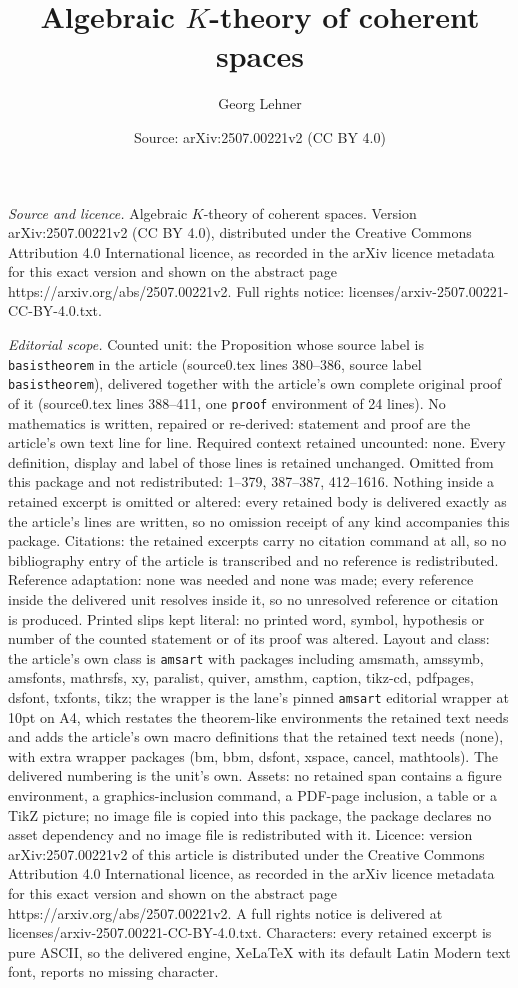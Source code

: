\documentclass[10pt,a4paper]{amsart}
\title[Algebraic $K$-theory of coherent spaces]{Algebraic $K$-theory of coherent spaces}
\author{Georg Lehner}
\date{Source: arXiv:2507.00221v2 (CC BY 4.0)}
\begin{document}
\maketitle

\noindent\emph{Source and licence.} Algebraic $K$-theory of coherent spaces. Version arXiv:2507.00221v2 (CC BY 4.0), distributed under the Creative Commons Attribution 4.0 International licence, as recorded in the arXiv licence metadata for this exact version and shown on the abstract page https://arxiv.org/abs/2507.00221v2. Full rights notice: licenses/arxiv-2507.00221-CC-BY-4.0.txt.\par\smallskip

\noindent\textit{Editorial scope.} Counted unit: the Proposition whose source label is \texttt{basistheorem} in the article (source0.tex lines 380--386, source label \texttt{basistheorem}), delivered together with the article's own complete original proof of it (source0.tex lines 388--411, one \texttt{proof} environment of 24 lines). No mathematics is written, repaired or re-derived: statement and proof are the article's own text line for line. Required context retained uncounted: none. Every definition, display and label of those lines is retained unchanged. Omitted from this package and not redistributed: 1--379, 387--387, 412--1616. Nothing inside a retained excerpt is omitted or altered: every retained body is delivered exactly as the article's lines are written, so no omission receipt of any kind accompanies this package. Citations: the retained excerpts carry no citation command at all, so no bibliography entry of the article is transcribed and no reference is redistributed. Reference adaptation: none was needed and none was made; every reference inside the delivered unit resolves inside it, so no unresolved reference or citation is produced. Printed slips kept literal: no printed word, symbol, hypothesis or number of the counted statement or of its proof was altered. Layout and class: the article's own class is \texttt{amsart} with packages including amsmath, amssymb, amsfonts, mathrsfs, xy, paralist, quiver, amsthm, caption, tikz-cd, pdfpages, dsfont, txfonts, tikz; the wrapper is the lane's pinned \texttt{amsart} editorial wrapper at 10pt on A4, which restates the theorem-like environments the retained text needs and adds the article's own macro definitions that the retained text needs (none), with extra wrapper packages (bm, bbm, dsfont, xspace, cancel, mathtools). The delivered numbering is the unit's own. Assets: no retained span contains a figure environment, a graphics-inclusion command, a PDF-page inclusion, a table or a TikZ picture; no image file is copied into this package, the package declares no asset dependency and no image file is redistributed with it. Licence: version arXiv:2507.00221v2 of this article is distributed under the Creative Commons Attribution 4.0 International licence, as recorded in the arXiv licence metadata for this exact version and shown on the abstract page https://arxiv.org/abs/2507.00221v2. A full rights notice is delivered at licenses/arxiv-2507.00221-CC-BY-4.0.txt. Characters: every retained excerpt is pure ASCII, so the delivered engine, XeLaTeX with its default Latin Modern text font, reports no missing character.
\end{document}
